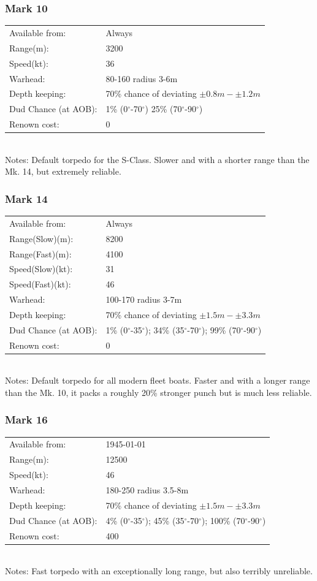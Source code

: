 \documentclass{article}
\newcommand{\degree}{$^{\circ}$}
\begin{document}
\subsubsection{Mark 10}
\begin{tabular}{l|l}
Available from:& Always\\
Range(m):& 3200\\
Speed(kt):&36\\
Warhead:& 80-160 radius 3-6m\\
Depth keeping:& 70\% chance of deviating $\pm 0.8m - \pm 1.2m$\\
Dud Chance (at AOB):& 1\% (0\degree -70\degree ) 25\% (70\degree-90\degree)\\
Renown cost:& 0\\
\end{tabular} \\
Notes: Default torpedo for the S-Class. Slower and with a shorter range than the Mk. 14, but extremely reliable.\\

\subsubsection{Mark 14}
\begin{tabular}{l|l}
Available from:& Always\\
Range(Slow)(m):& 8200\\
Range(Fast)(m):& 4100\\
Speed(Slow)(kt):&31\\
Speed(Fast)(kt):& 46\\
Warhead:& 100-170 radius 3-7m\\
Depth keeping:& 70\% chance of deviating $\pm 1.5m - \pm 3.3m$\\
Dud Chance (at AOB):& 1\% (0\degree-35\degree); 34\% (35\degree-70\degree); 99\% (70\degree-90\degree)\\
Renown cost:& 0\\
\end{tabular} \\
Notes: Default torpedo for all modern fleet boats. Faster and with a longer range than the Mk. 10, it packs a roughly 20\% stronger punch but is much less reliable.

\subsubsection{Mark 16}
\begin{tabular}{l|l}
Available from:& 1945-01-01\\
Range(m):& 12500\\
Speed(kt):&46\\
Warhead:& 180-250 radius 3.5-8m\\
Depth keeping:&  70\% chance of deviating $\pm 1.5m - \pm 3.3m$\\
Dud Chance (at AOB):& 4\% (0\degree-35\degree); 45\% (35\degree-70\degree); 100\% (70\degree-90\degree)\\
Renown cost:& 400\\
\end{tabular} \\
Notes: Fast torpedo with an exceptionally long range, but also terribly unreliable.
\end{document}
